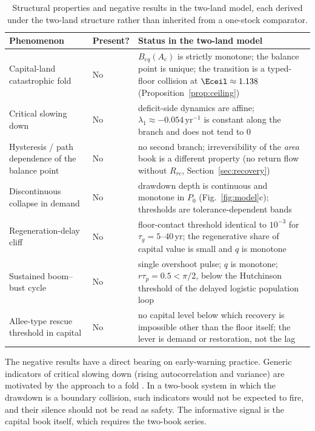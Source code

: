 \begin{table}[!htbp]
\centering\small
\caption{Structural properties and negative results in the two-land model, each derived under the two-land structure rather than inherited from a one-stock comparator.}
\label{tab:neg}
\begin{tabularx}{\textwidth}{>{\raggedright\arraybackslash}p{} l X}
\toprule
Phenomenon & Present? & Status in the two-land model \\
\midrule
Capital-land catastrophic fold & No & $B_{eq}(A_c)$ is strictly monotone; the balance point is unique; the transition is a typed-floor collision at $\Eceil\approx1.138$ (Proposition~\ref{prop:ceiling}) \\
Critical slowing down & No & deficit-side dynamics are affine; $\lambda_1\approx-0.054\,\mathrm{yr}^{-1}$ is constant along the branch and does not tend to $0$ \\
Hysteresis / path dependence of the balance point & No & no second branch; irreversibility of the \emph{area} book is a different property (no return flow without $R_{rc}$, Section~\ref{sec:recovery}) \\
Discontinuous collapse in demand & No & drawdown depth is continuous and monotone in $P_0$ (Fig.~\ref{fig:model}c); thresholds are tolerance-dependent bands \\
Regeneration-delay cliff & No & floor-contact threshold identical to $10^{-3}$ for $\tau_g=5$--$40$\,yr; the regenerative share of capital value is small and $q$ is monotone \\
Sustained boom--bust cycle & No & single overshoot pulse; $q$ is monotone; $r\tau_p=0.5<\pi/2$, below the Hutchinson threshold of the delayed logistic population loop \citep{Hutchinson1948} \\
Allee-type rescue threshold in capital & No & no capital level below which recovery is impossible other than the floor itself; the lever is demand or restoration, not the lag \\
\bottomrule
\end{tabularx}
\end{table}

The negative results have a direct bearing on early-warning practice. Generic indicators of critical slowing down (rising autocorrelation and variance) are motivated by the approach to a fold \citep{Scheffer2001}. In a two-book system in which the drawdown is a boundary collision, such indicators would not be expected to fire, and their silence should not be read as safety. The informative signal is the capital book itself, which requires the two-book series.

